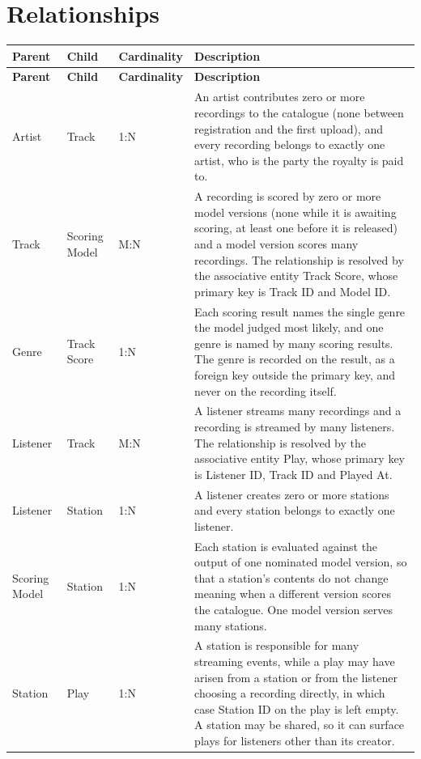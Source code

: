 \documentclass[11pt]{article}
\begin{document}
\section{Relationships}\label{sec:rels}

\begin{longtable}{|L{1.15in}|L{1.15in}|L{0.9in}|L{3.05in}|}
\hline
{}\textbf{Parent} & \textbf{Child} & \textbf{Cardinality} & \textbf{Description} \\ \hline
\endfirsthead
\hline
{}\textbf{Parent} & \textbf{Child} & \textbf{Cardinality} & \textbf{Description} \\ \hline
\endhead
Artist & Track & 1:N & An artist contributes zero or more recordings to the catalogue (none between registration and the first upload), and every recording belongs to exactly one artist, who is the party the royalty is paid to. \\ \hline
Track & Scoring Model & M:N & A recording is scored by zero or more model versions (none while it is awaiting scoring, at least one before it is released) and a model version scores many recordings. The relationship is resolved by the associative entity Track Score, whose primary key is Track ID and Model ID. \\ \hline
Genre & Track Score & 1:N & Each scoring result names the single genre the model judged most likely, and one genre is named by many scoring results. The genre is recorded on the result, as a foreign key outside the primary key, and never on the recording itself. \\ \hline
Listener & Track & M:N & A listener streams many recordings and a recording is streamed by many listeners. The relationship is resolved by the associative entity Play, whose primary key is Listener ID, Track ID and Played At. \\ \hline
Listener & Station & 1:N & A listener creates zero or more stations and every station belongs to exactly one listener. \\ \hline
Scoring Model & Station & 1:N & Each station is evaluated against the output of one nominated model version, so that a station's contents do not change meaning when a different version scores the catalogue. One model version serves many stations. \\ \hline
Station & Play & 1:N & A station is responsible for many streaming events, while a play may have arisen from a station or from the listener choosing a recording directly, in which case Station ID on the play is left empty. A station may be shared, so it can surface plays for listeners other than its creator. \\ \hline

\end{longtable}
\end{document}
